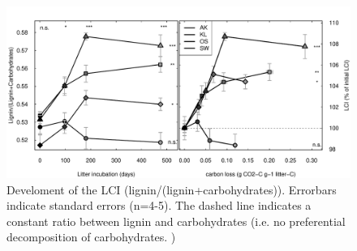 \documentclass[authoryear,preprint,review,12pt]{elsarticle}
\begin{document}
%
%
%
%
%
%
%
%

\newpage
\begin{figure}[h!]
\vspace*{2mm}
\begin{center}
\includegraphics{sbb-lci}
\end{center}
\caption{Develoment of the LCI (lignin/(lignin+carbohydrates)). Errorbars indicate standard errors (n=4-5). The dashed line indicates a constant ratio between lignin and carbohydrates (i.e. no preferential decomposition of carbohydrates. )}
\label{fig:lci}
\end{figure}
\end{document}
